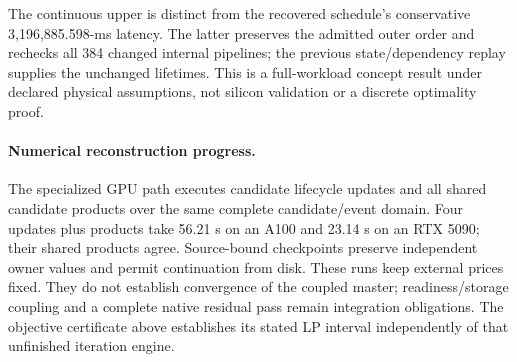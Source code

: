 The continuous upper is distinct from the recovered schedule's conservative
3,196,885.598-ms latency. The latter preserves the admitted outer order and
rechecks all 384 changed internal pipelines; the previous state/dependency
replay supplies the unchanged lifetimes. This is a full-workload concept
result under declared physical assumptions, not silicon validation or a
discrete optimality proof.

\paragraph{Numerical reconstruction progress.}
The specialized GPU path executes candidate lifecycle updates and all shared
candidate products over the same complete candidate/event domain. Four
updates plus products take 56.21 s on an A100 and 23.14 s on an RTX 5090;
their shared products agree. Source-bound checkpoints preserve independent
owner values and permit continuation from disk. These runs keep external
prices fixed. They do not establish convergence of the coupled master;
readiness/storage coupling and a complete native residual pass remain
integration obligations. The objective certificate above establishes its
stated LP interval independently of that unfinished iteration engine.
